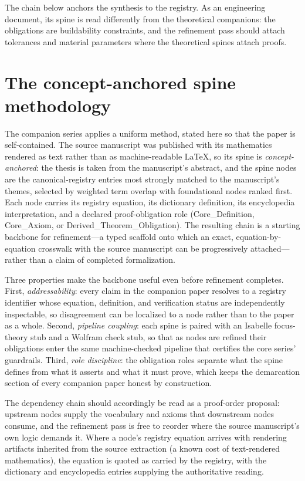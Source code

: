 \documentclass[11pt]{article}
\theoremstyle{remark}
\begin{document}
The chain below anchors the synthesis to the registry. As an engineering document, its spine is read differently from the theoretical companions: the obligations are buildability constraints, and the refinement pass should attach tolerances and material parameters where the theoretical spines attach proofs.

\section{The concept-anchored spine methodology}
\label{sec:method}

The companion series applies a uniform method, stated here so that the paper is self-contained. The source manuscript was published with its mathematics rendered as text rather than as machine-readable LaTeX, so its spine is \emph{concept-anchored}: the thesis is taken from the manuscript's abstract, and the spine nodes are the canonical-registry entries most strongly matched to the manuscript's themes, selected by weighted term overlap with foundational nodes ranked first. Each node carries its registry equation, its dictionary definition, its encyclopedia interpretation, and a declared proof-obligation role (Core\_Definition, Core\_Axiom, or Derived\_Theorem\_Obligation). The resulting chain is a starting backbone for refinement---a typed scaffold onto which an exact, equation-by-equation crosswalk with the source manuscript can be progressively attached---rather than a claim of completed formalization.

Three properties make the backbone useful even before refinement completes. First, \emph{addressability}: every claim in the companion paper resolves to a registry identifier whose equation, definition, and verification status are independently inspectable, so disagreement can be localized to a node rather than to the paper as a whole. Second, \emph{pipeline coupling}: each spine is paired with an Isabelle focus-theory stub and a Wolfram check stub, so that as nodes are refined their obligations enter the same machine-checked pipeline that certifies the core series' guardrails. Third, \emph{role discipline}: the obligation roles separate what the spine defines from what it asserts and what it must prove, which keeps the demarcation section of every companion paper honest by construction.

The dependency chain should accordingly be read as a proof-order proposal: upstream nodes supply the vocabulary and axioms that downstream nodes consume, and the refinement pass is free to reorder where the source manuscript's own logic demands it. Where a node's registry equation arrives with rendering artifacts inherited from the source extraction (a known cost of text-rendered mathematics), the equation is quoted as carried by the registry, with the dictionary and encyclopedia entries supplying the authoritative reading.
\end{document}
